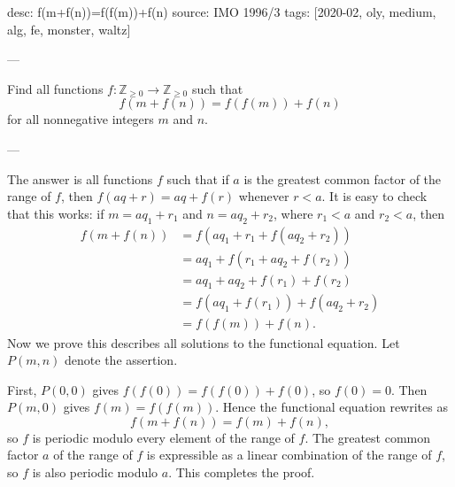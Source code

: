 desc: f(m+f(n))=f(f(m))+f(n)
source: IMO 1996/3
tags: [2020-02, oly, medium, alg, fe, monster, waltz]

---

Find all functions $f:\mathbb Z_{\ge0}\to\mathbb Z_{\ge0}$ such that \[f(m+f(n))=f(f(m))+f(n)\]
for all nonnegative integers $m$ and $n$.

---

The answer is all functions $f$ such that if $a$ is the greatest common factor of the range of $f$, then $f(aq+r)=aq+f(r)$ whenever $r<a$. It is easy to check that this works: if $m=aq_1+r_1$ and $n=aq_2+r_2$, where $r_1<a$ and $r_2<a$, then
\begin{align*}
    f(m+f(n))&=f(aq_1+r_1+f(aq_2+r_2))\\
    &=aq_1+f(r_1+aq_2+f(r_2))\\
    &=aq_1+aq_2+f(r_1)+f(r_2)\\
    &=f(aq_1+f(r_1))+f(aq_2+r_2)\\
    &=f(f(m))+f(n).
\end{align*}
Now we prove this describes all solutions to the functional equation. Let $P(m,n)$ denote the assertion.

First, $P(0,0)$ gives $f(f(0))=f(f(0))+f(0)$, so $f(0)=0$. Then $P(m,0)$ gives $f(m)=f(f(m))$. Hence the functional equation rewrites as \[f(m+f(n))=f(m)+f(n),\]
so $f$ is periodic modulo every element of the range of $f$. The greatest common factor $a$ of the range of $f$ is expressible as a linear combination of the range of $f$, so $f$ is also periodic modulo $a$. This completes the proof.
